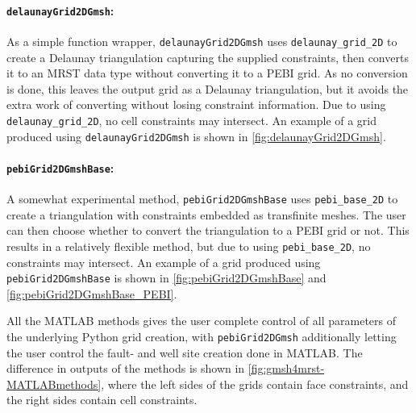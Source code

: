 \paragraph{\texttt{delaunayGrid2DGmsh}:}
As a simple function wrapper, \verb|delaunayGrid2DGmsh| uses \verb|delaunay_grid_2D| to create a Delaunay triangulation capturing the supplied constraints, then converts it to an MRST data type without converting it to a PEBI grid. As no conversion is done, this leaves the output grid as a Delaunay triangulation, but it avoids the extra work of converting without losing constraint information. Due to using \verb|delaunay_grid_2D|, no cell constraints may intersect. An example of a grid produced using \verb|delaunayGrid2DGmsh| is shown in \autoref{fig:delaunayGrid2DGmsh}.

\paragraph{\texttt{pebiGrid2DGmshBase}:}
A somewhat experimental method, \verb|pebiGrid2DGmshBase| uses \verb|pebi_base_2D| to create a triangulation with constraints embedded as transfinite meshes. The user can then choose whether to convert the triangulation to a PEBI grid or not. This results in a relatively flexible method, but due to using \verb|pebi_base_2D|, no constraints may intersect. An example of a grid produced using \verb|pebiGrid2DGmshBase| is shown in \autoref{fig:pebiGrid2DGmshBase} and \autoref{fig:pebiGrid2DGmshBase_PEBI}.

All the MATLAB methods gives the user complete control of all parameters of the underlying Python grid creation, with \verb|pebiGrid2DGmsh| additionally letting the user control the fault- and well site creation done in MATLAB. The difference in outputs of the methods is shown in \autoref{fig:gmsh4mrst-MATLABmethods}, where the left sides of the grids contain face constraints, and the right sides contain cell constraints.


